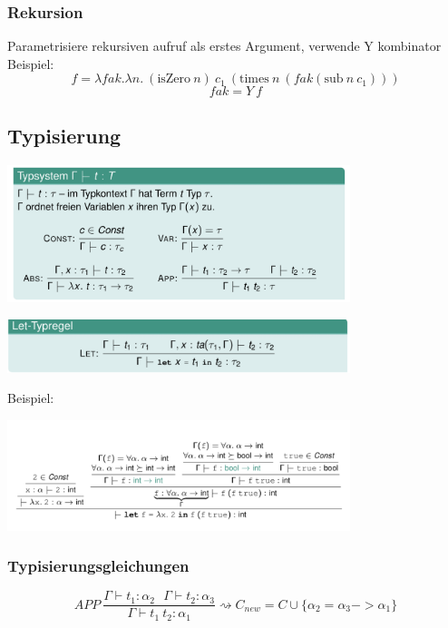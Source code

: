 \subsubsection{Rekursion}
Parametrisiere rekursiven aufruf als erstes Argument, verwende Y kombinator\\
Beispiel:\\
$$f = \lambda fak. \lambda n. \medspace (\text{isZero}\medspace n)  \medspace c_1 \medspace (\text{times} \medspace n \medspace (fak (\text{sub}\medspace n \medspace c_1)))$$
$$fak = Y \medspace f$$

\subsection{Typisierung}
\begin{center}
	\includegraphics[width=0.75\textwidth]{images/types.png}	
\end{center}
\begin{center}
		\includegraphics[width=0.75\textwidth]{images/let.png}
\end{center}
Beispiel:\\
\begin{center}
	\includegraphics[width=0.75\textwidth]{images/let_ex.png}
\end{center}
\subsubsection{Typisierungsgleichungen}
$$APP \medspace\frac{\Gamma \vdash t_1 : \alpha_2 \medspace\medspace\medspace \Gamma \vdash t_2 : \alpha_3}{\Gamma \vdash t_1 \medspace t_2 : \alpha_1} \rightsquigarrow C_{new} = C \cup \{\alpha_2 = \alpha_3 -> \alpha_1\}$$

